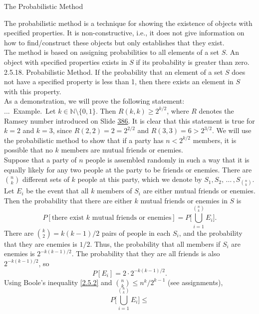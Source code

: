 \documentclass[smaller,hyperref={CJKbookmarks=true}]{beamer}
\newcommand{\N}{\mathbb{N}} \newcommand{\Z}{\mathbb{Z}} \newcommand{\Q}{\mathbb{Q}}
\newcounter{zhuo}[subsection]
\renewcommand{\thezhuo}{\thesection.\thesubsection.\arabic{zhuo}}
\newenvironment{EXAMPLE}{\stepcounter{zhuo}\alert{\!\thezhuo.~Example.\,}}{}
\begin{document}
\begin{frame}{The Probabilistic Method}
\begin{spacing}{1.05}
The probabilistic method is a technique for showing the existence of
objects with specified properties. It is non-constructive, i.e., it does not
give information on how to find/construct these objects but only
establishes that they exist.\\[5pt]
The method is based on assigning probabilities to all elements of a set $S$.
An object with specified properties exists in $S$ if its probability is greater
than zero.\\[5pt]
\alert{2.5.18. Probabilistic Method.} If the probability that an element of a set $S$
does not have a specified property is less than 1, then there exists an
element in $S$ with this property.\\[5pt]
As a demonstration, we will prove the following statement:\\[4pt]
\begin{EXAMPLE}
Let $k\in\N\setminus\{0,1\}$. Then $R(k,k)\geq 2^{k/2}$, where $R$ denotes the Ramsey number introduced on Slide \hyperlink{386}{386}.
\end{EXAMPLE}
\newpage
It is clear that this statement is true for $k=2$ and $k=3$, since $R(2,2)=2=2^{2/2}$ and $R(3,3)=6>2^{3/2}$. We will use the probabilistic method to show that if a party has $n<2^{k/2}$ members, it is possible that
no $k$ members are mutual friends or enemies.\\[5pt]
Suppose that a party of $n$ people is assembled randomly in such a way that
it is equally likely for any two people at the party to be friends or enemies. There are $\binom{n}{k}$ different sets of $k$ people at this party, which we denote by $S_1,S_2,\,...\,,S_{\binom{n}{k}}$. Let $E_i$ be the event that all $k$ members of $S_i$ are either mutual friends or enemies. Then the probability that there are either $k$
mutual friends or enemies in $S$ is
\[P[\text{there exist $k$ mutual friends or enemies}]=P\Big[\bigcup_{i=1}^{\binom{n}{k}}E_i\Big].\]
\newpage
There are $\binom{k}{2}=k(k-1)/2$ pairs of people in each $S_i$, and the probability that they are enemies is $1/2$. Thus, the probability that all members if $S_i$ are enemies is $2^{-k(k-1)/2}$. The probability that they are all friends is also $2^{-k(k-1)/2}$, so
\[P[E_i]=2\cdot2^{-k(k-1)/2}.\]
Using Boole's inequality \eqref{2.5.2} and $\binom{n}{k}\leq n^k/2^{k-1}$ (see assignments),
\[P\Big[\bigcup_{i=1}^{\binom{n}{k}}E_i\Big]\leq
\]
\end{spacing}
\end{frame}
\end{document}
